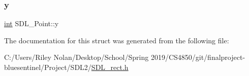 \mbox{\label{struct_s_d_l___point_aaa68aefa869f6bdf46367a70bd9414b0}} 
\subsubsection{\texorpdfstring{y}{y}}
{\footnotesize\ttfamily \mbox{\hyperlink{warnings_8h_a74f207b5aa4ba51c3a2ad59b219a423b}{int}} S\+D\+L\+\_\+\+Point\+::y}



The documentation for this struct was generated from the following file\+:\begin{DoxyCompactItemize}
\item 
C\+:/\+Users/\+Riley Nolan/\+Desktop/\+School/\+Spring 2019/\+C\+S4850/git/finalproject-\/bluesentinel/\+Project/\+S\+D\+L2/\mbox{\hyperlink{_s_d_l__rect_8h}{S\+D\+L\+\_\+rect.\+h}}\end{DoxyCompactItemize}

